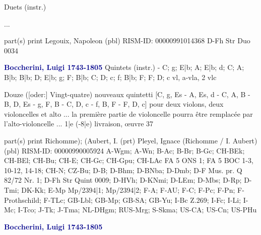 \documentclass[twocolumn]{book}
\begin{document}
\newline Duets (instr.)
\newline \begin{itshape}...\end{itshape} 
\newline \textcolor{darkblue}{}  part(s)
\newline print
\newline Legouix, Napoleon  (pbl)
\newline RISM-ID: 00000991014368
\newline D-Fh  Str Duo 0034
\newline \par \vspace{7pt} \textcolor{darkblue}{\textbf{Boccherini, Luigi  1743-1805}}
\newline Quintets (instr.) - C; g; E|b; A; E|b; d; C; A; B|b; B|b; D; E|b; g; F; B|b; C; D; c; f; B|b; F; F; D; c
 vl, a-vla, 2 vlc
\newline \begin{itshape}Douze ([oder:] Vingt-quatre) nouveaux quintetti [C, g, Es - A, Es, d - C, A, B - B, D, Es - g, F, B - C, D, c - f, B, F - F, D, c] pour deux violons, deux violoncelles et alto ... la première partie de violoncelle pourra être remplacée par l'alto-violoncelle ... 1|e (-8|e) livraison, œuvre 37\end{itshape} 
\newline \textcolor{darkblue}{}  part(s)
\newline print
\newline Richomme); (Aubert, I.  (prt)
\newline Pleyel, Ignace (Richomme / I. Aubert)  (pbl)
\newline RISM-ID: 00000990005924
\newline A-Wgm; A-Wn; B-Ac; B-Br; B-Gc; CH-BEk; CH-BEl; CH-Bu; CH-E; CH-Gc; CH-Gpu; CH-LAc  FA 5 ONS 1; FA 5 BOC 1-3, 10-12, 14-18; CH-N; CZ-Bu; D-B; D-Bhm; D-BNba; D-Dmb; D-F  Mus. pr. Q 82/72 Nr. 1; D-Fh  Str Quint 0009; D-HVh; D-KNmi; D-LEm; D-Mbs; D-Rp; D-Tmi; DK-Kk; E-Mp  Mp/2394|1; Mp/2394|2; F-A; F-AU; F-C; F-Pc; F-Pn; F-Prothschild; F-TLc; GB-Lbl; GB-Mp; GB-SA; GB-Yu; I-Bc  Z.269; I-Fc; I-Li; I-Mc; I-Tco; J-Tk; J-Tma; NL-DHgm; RUS-Mrg; S-Skma; US-CA; US-Cn; US-PHu
\newline \par \vspace{7pt} \textcolor{darkblue}{\textbf{Boccherini, Luigi  1743-1805}}
\end{document}
